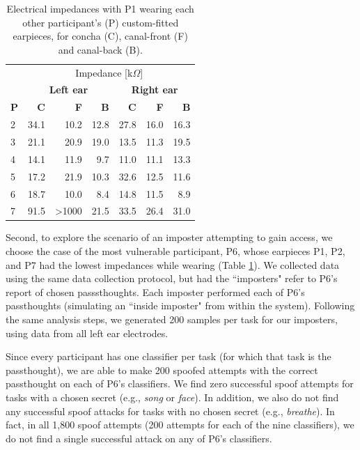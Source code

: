 \documentclass[a4paper,twoside]{article}
\begin{document}
\begin{table}[h]
\caption{Electrical impedances with P1 wearing each other participant's (P) custom-fitted earpieces, for concha (C), canal-front (F) and canal-back (B).}
\label{tab:p1_imposter_impedances}
\begin{center}
\begin{tabular}{lrrrrrr}
& \multicolumn{6}{c}{Impedance [k\(\Omega\)]} \\
\cline{2-7}
& \multicolumn{3}{|c|}{\textbf{Left ear}} & \multicolumn{3}{c|}{\textbf{Right ear}} \\
\textbf{P} & \textbf{C} & \textbf{F} & \textbf{B} & \textbf{C} & \textbf{F} & \textbf{B} \\
\hline
2 & 34.1 & 10.2 & 12.8 & 27.8 & 16.0 & 16.3\\
3 & 21.1 & 20.9 & 19.0 & 13.5 & 11.3 & 19.5\\
4 & 14.1 & 11.9 & 9.7 & 11.0 & 11.1 & 13.3\\
5 & 17.2 & 21.9 & 10.3 & 32.6 & 12.5 & 11.6\\
6 & 18.7 & 10.0 & 8.4 & 14.8 & 11.5 & 8.9\\
7 & 91.5 & \textgreater1000 & 21.5 & 33.5 & 26.4 & 31.0\\
\end{tabular}
\end{center}
\end{table}

Second, to explore the scenario of an imposter attempting to gain access, we choose the case of the most vulnerable participant, P6, whose earpieces P1, P2, and P7 had the lowest impedances while wearing (Table \ref{tab:p1_imposter_impedances}). We collected data using the same data collection protocol, but had the ``imposters" refer to P6's report of chosen passsthoughts.
Each imposter performed each of P6's passthoughts (simulating an ``inside imposter" from within the system). Following the same analysis steps, we generated 200 samples per task for our imposters, using data from all left ear electrodes.

Since every participant has one classifier per task (for which that task is the passthought), we are able to make 200 spoofed attempts with the correct passthought on each of P6's classifiers. We find zero successful spoof attempts for tasks with a chosen secret (e.g., \textit{song} or \textit{face}). In addition, we also do not find any successful spoof attacks for tasks with no chosen secret (e.g., \textit{breathe}). In fact, in all 1,800 spoof attempts (200 attempts for each of the nine classifiers), we do not find a single successful attack on any of P6's classifiers.
\end{document}
